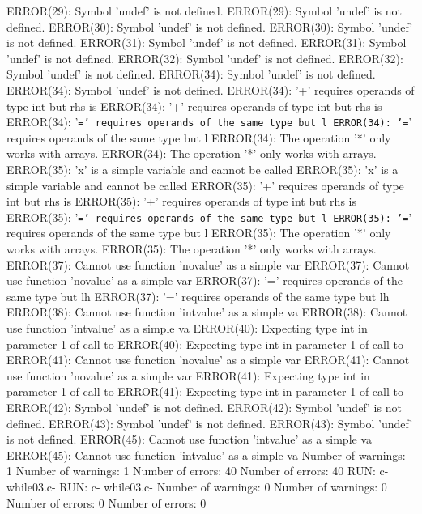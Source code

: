\documentclass[12pt]{book}
\begin{document}
ERROR(29): Symbol 'undef' is not defined.                        ERROR(29): Symbol 'undef' is not defined.
ERROR(30): Symbol 'undef' is not defined.                        ERROR(30): Symbol 'undef' is not defined.
ERROR(31): Symbol 'undef' is not defined.                        ERROR(31): Symbol 'undef' is not defined.
ERROR(32): Symbol 'undef' is not defined.                        ERROR(32): Symbol 'undef' is not defined.
ERROR(34): Symbol 'undef' is not defined.                        ERROR(34): Symbol 'undef' is not defined.
ERROR(34): '+' requires operands of type int but rhs is         ERROR(34): '+' requires operands of type int but rhs is 
ERROR(34): '\texttt{=' requires operands of the same type but l	ERROR(34): '=}' requires operands of the same type but l
ERROR(34): The operation '*' only works with arrays.                ERROR(34): The operation '*' only works with arrays.
ERROR(35): 'x' is a simple variable and cannot be called        ERROR(35): 'x' is a simple variable and cannot be called
ERROR(35): '+' requires operands of type int but rhs is         ERROR(35): '+' requires operands of type int but rhs is 
ERROR(35): '\texttt{=' requires operands of the same type but l	ERROR(35): '=}' requires operands of the same type but l
ERROR(35): The operation '*' only works with arrays.                ERROR(35): The operation '*' only works with arrays.
ERROR(37): Cannot use function 'novalue' as a simple var        ERROR(37): Cannot use function 'novalue' as a simple var
ERROR(37): '=' requires operands of the same type but lh        ERROR(37): '=' requires operands of the same type but lh
ERROR(38): Cannot use function 'intvalue' as a simple va        ERROR(38): Cannot use function 'intvalue' as a simple va
ERROR(40): Expecting type int in parameter 1 of call to         ERROR(40): Expecting type int in parameter 1 of call to 
ERROR(41): Cannot use function 'novalue' as a simple var        ERROR(41): Cannot use function 'novalue' as a simple var
ERROR(41): Expecting type int in parameter 1 of call to         ERROR(41): Expecting type int in parameter 1 of call to 
ERROR(42): Symbol 'undef' is not defined.                        ERROR(42): Symbol 'undef' is not defined.
ERROR(43): Symbol 'undef' is not defined.                        ERROR(43): Symbol 'undef' is not defined.
ERROR(45): Cannot use function 'intvalue' as a simple va        ERROR(45): Cannot use function 'intvalue' as a simple va
Number of warnings: 1                                                Number of warnings: 1
Number of errors: 40                                                Number of errors: 40
RUN: c- while03.c-                                                RUN: c- while03.c-
Number of warnings: 0                                                Number of warnings: 0
Number of errors: 0                                                Number of errors: 0
\end{document}
